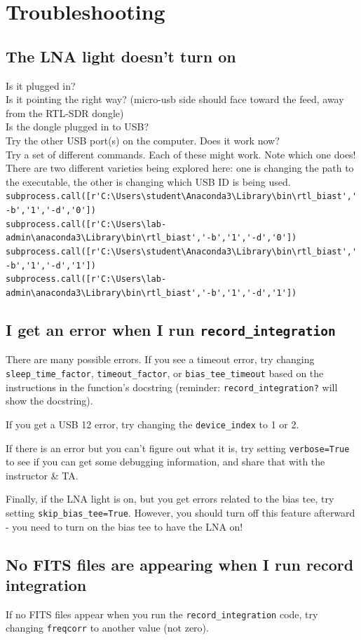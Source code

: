 \documentclass[11pt]{article}
\begin{document}
\section{Troubleshooting}
\label{sec:troubleshooting}
\subsection{The LNA light doesn't turn on}

Is it plugged in?\\

Is it pointing the right way?  (micro-usb side should face toward the feed, away from the RTL-SDR dongle)\\

Is the dongle plugged in to USB?\\
Try the other USB port(s) on the computer.  Does it work now?\\

Try a set of different commands.  Each of these might work.  Note which one
does!  There are two different varieties being explored here: one is changing
the path to the executable, the other is changing which USB ID is being used. \\
\verb|subprocess.call([r'C:\Users\student\Anaconda3\Library\bin\rtl_biast','-b','1','-d','0'])| \\
\verb|subprocess.call([r'C:\Users\lab-admin\anaconda3\Library\bin\rtl_biast','-b','1','-d','0'])| \\
\verb|subprocess.call([r'C:\Users\student\Anaconda3\Library\bin\rtl_biast','-b','1','-d','1'])| \\
\verb|subprocess.call([r'C:\Users\lab-admin\anaconda3\Library\bin\rtl_biast','-b','1','-d','1'])| \\

\subsection{I get an error when I run \texttt{record\_integration}}
There are many possible errors.  If you see a timeout error,
try changing \verb|sleep_time_factor|, \verb|timeout_factor|,
or \verb|bias_tee_timeout| based on the instructions in the
function's docstring (reminder: \verb|record_integration?| will
show the docstring).

If you get a USB 12 error, try changing the \verb|device_index|
to 1 or 2.

If there is an error but you can't figure out what it is,
try setting \verb|verbose=True| to see if you can get some
debugging information, and share that with the instructor \& TA.

Finally, if the LNA light is on, but you get errors related
to the bias tee, try setting \verb|skip_bias_tee=True|.  However,
you should turn off this feature afterward - you need to turn
on the bias tee to have the LNA on!

\subsection{No FITS files are appearing when I run record integration}

If no FITS files appear when you run the \verb|record_integration| code, try
changing \verb|freqcorr| to another value (not zero).
\end{document}
